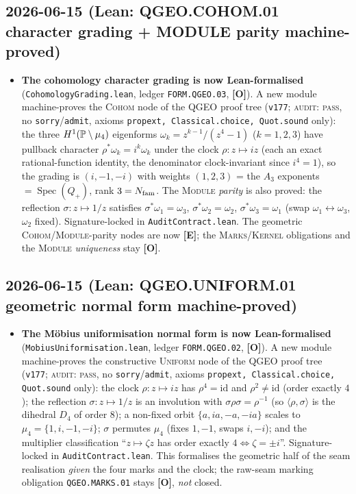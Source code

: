 \documentclass[11pt]{article}
\providecommand{\mE}{\textbf{[E]}}\providecommand{\mC}{\textbf{[C]}}
\providecommand{\mO}{\textbf{[O]}}\providecommand{\mX}{\textbf{[X]}}
\begin{document}
\subsection*{2026-06-15 (Lean: QGEO.COHOM.01 character grading + MODULE parity machine-proved)}
\begin{itemize}
\item \textbf{The cohomology character grading is now Lean-formalised}
  (\texttt{CohomologyGrading.lean}, ledger \texttt{FORM.QGEO.03}, \mO). A new module machine-proves the
  \textsc{Cohom} node of the QGEO proof tree (\texttt{v177}; \textsc{audit: pass}, no
  \texttt{sorry}/\texttt{admit}, axioms \texttt{propext, Classical.choice, Quot.sound} only): the three
  $H^1(\mathbb{P}\setminus\mu_4)$ eigenforms $\omega_k=z^{k-1}/(z^4-1)$ ($k{=}1,2,3$) have pullback character
  $\rho^*\omega_k=i^k\omega_k$ under the clock $\rho:z\mapsto iz$ (each an exact rational-function identity,
  the denominator clock-invariant since $i^4{=}1$), so the grading is $(i,-1,-i)$ with weights $(1,2,3)$ =
  the $A_3$ exponents $=\operatorname{Spec}(Q_+)$, rank $3=N_{\mathrm{fam}}$. The \textsc{Module} \emph{parity} is also
  proved: the reflection $\sigma:z\mapsto1/z$ satisfies $\sigma^*\omega_1=\omega_3$,
  $\sigma^*\omega_2=\omega_2$, $\sigma^*\omega_3=\omega_1$ (swap $\omega_1\!\leftrightarrow\!\omega_3$,
  $\omega_2$ fixed). Signature-locked in \texttt{AuditContract.lean}. The geometric \textsc{Cohom}/\textsc{Module}-parity
  nodes are now \mE; the \textsc{Marks}/\textsc{Kernel} obligations and the \textsc{Module} \emph{uniqueness}
  stay \mO.
\end{itemize}

\subsection*{2026-06-15 (Lean: QGEO.UNIFORM.01 geometric normal form machine-proved)}
\begin{itemize}
\item \textbf{The M\"obius uniformisation normal form is now Lean-formalised}
  (\texttt{Mobius\allowbreak Uniformisation.lean}, ledger \texttt{FORM.QGEO.02}, \mO). A new module machine-proves the
  constructive \textsc{Uniform} node of the QGEO proof tree (\texttt{v177}; \textsc{audit: pass}, no
  \texttt{sorry}/\texttt{admit}, axioms \texttt{propext, Classical.choice, Quot.sound} only): the clock
  $\rho:z\mapsto iz$ has $\rho^4{=}\mathrm{id}$ and $\rho^2{\neq}\mathrm{id}$ (order exactly $4$); the
  reflection $\sigma:z\mapsto1/z$ is an involution with $\sigma\rho\sigma=\rho^{-1}$ (so $\langle\rho,\sigma
  \rangle$ is the dihedral $D_4$ of order $8$); a non-fixed orbit $\{a,ia,-a,-ia\}$ scales to
  $\mu_4=\{1,i,-1,-i\}$; $\sigma$ permutes $\mu_4$ (fixes $1,-1$, swaps $i,-i$); and the multiplier
  classification ``$z\mapsto\zeta z$ has order exactly $4\Leftrightarrow\zeta=\pm i$''. Signature-locked in
  \texttt{AuditContract.lean}. This formalises the geometric half of the seam realisation \emph{given} the
  four marks and the clock; the raw-seam marking obligation \texttt{QGEO.MARKS.01} stays \mO, \emph{not}
  closed.
\end{itemize}
\end{document}

